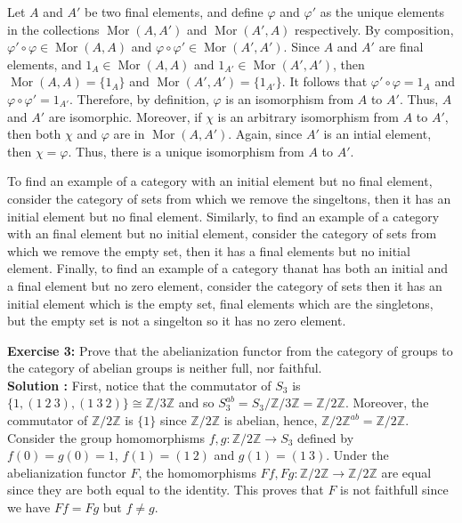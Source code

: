\documentclass{article}
\newcommand{\Zn}[1]{\mathbb{Z}/ #1 \mathbb{Z}}
\DeclareMathOperator{\Mor}{Mor}
\newcommand{\isomorphic}{\cong}
\begin{document}
Let $A$ and $A'$ be two final elements, and define $\varphi$ and $\varphi'$ as the unique elements in the collections $\Mor(A,A')$ and $\Mor(A', A)$ respectively. By composition, $\varphi' \circ \varphi \in \Mor(A,A)$ and $\varphi \circ \varphi' \in \Mor(A',A')$. Since $A$ and $A'$ are final elements, and $1_A \in \Mor(A,A)$ and $1_{A'} \in \Mor(A', A')$, then $\Mor(A, A) = \{1_{A}\}$ and $\Mor(A', A') = \{1_{A'}\}$. It follows that $\varphi' \circ \varphi = 1_A$ and $\varphi \circ \varphi' = 1_{A'}$. Therefore, by definition, $\varphi$ is an isomorphism from $A$ to $A'$. Thus, $A$ and $A'$ are isomorphic. Moreover, if $\chi$ is an arbitrary isomorphism from $A$ to $A'$, then both $\chi$ and $\varphi$ are in $\Mor(A,A')$. Again, since $A'$ is an intial element, then $\chi = \varphi$. Thus, there is a unique isomorphism from $A$ to $A'$.

To find an example of a category with an initial element but no final element, consider the category of sets from which we remove the singeltons, then it has an initial element but no final element. Similarly, to find an example of a category with an final element but no initial element, consider the category of sets from which we remove the empty set, then it has a final elements but no initial element. Finally, to find an example of a category thanat has both an initial and a final element but no zero element, consider the category of sets then it has an initial element which is the empty set, final elements which are the singletons, but the empty set is not a singelton so it has no zero element.

\newpage

\noindent \textbf{Exercise 3:} Prove that the abelianization functor from the category of groups to the category of abelian groups is neither full, nor faithful. \\

\noindent \textbf{Solution :} First, notice that the commutator of $S_3$ is $\{1, (1 \ 2 \ 3), (1 \ 3 \ 2)\} \isomorphic \Zn{3}$ and so $S_3^{ab} = S_3 / \Zn{3} = \Zn{2}$. Moreover, the commutator of $\Zn{2}$ is $\{1\}$ since $\Zn{2}$ is abelian, hence, $\Zn{2}^{ab} = \Zn{2}$. Consider the group homomorphisms $f,g : \Zn{2} \to S_3$ defined by $f(0) = g(0) = 1$, $f(1) = (1 \ 2)$ and $g(1) = (1 \ 3)$. Under the abelianization functor $F$, the homomorphisms $Ff, Fg : \Zn{2} \to \Zn{2}$ are equal since they are both equal to the identity. This proves that $F$ is not faithfull since we have $Ff = Fg$ but $f \neq g$.
\end{document}
